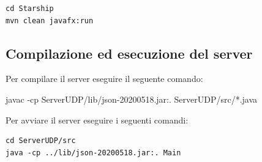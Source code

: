 \documentclass{article}
\newenvironment{commandbox}{%
  \begin{tcolorbox}[colback=white,colframe=black!50!white,sharp corners,width=\textwidth]%
  \ttfamily
}{%
  \end{tcolorbox}%
}
\begin{document}
\begin{commandbox}
\begin{verbatim}
cd Starship
mvn clean javafx:run
\end{verbatim}
\end{commandbox}

\subsection{Compilazione ed esecuzione del server}

Per compilare il server eseguire il seguente comando:
\begin{commandbox}
javac -cp ServerUDP/lib/json-20200518.jar:. ServerUDP/src/*.java
\end{commandbox}

Per avviare il server eseguire i seguenti comandi:
\begin{commandbox}
\begin{verbatim}
cd ServerUDP/src
java -cp ../lib/json-20200518.jar:. Main
\end{verbatim}
\end{commandbox}



\clearpage
\end{document}

